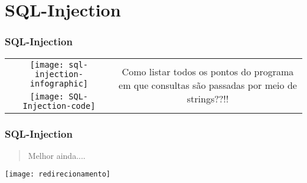 \documentclass[10pt, aspectratio=169]{beamer}
\begin{document}
\section{SQL-Injection}
\begin{frame}
	\frametitle{SQL-Injection}
	
	\begin{quotation}
	\end{quotation}
	\begin{center}
		\begin{tabular}{c c}
			\texttt{[image: sql-injection-infographic]} & \multirow{2}{4cm}{Como listar todos os pontos do programa em que consultas são passadas por meio de strings??!!}
			\\
			\texttt{[image: SQL-Injection-code]}
		\end{tabular}
		
	\end{center}
	
	
	
	
	\vfill
	\vfill
	
\end{frame}

\begin{frame}
	\frametitle{SQL-Injection}
	
	\begin{quotation}
		\Large{Melhor ainda....}
	\end{quotation}
	\begin{center}
		
		\texttt{[image: redirecionamento]}
	\end{center}
	
	
	
	
	\vfill
	\vfill
	
\end{frame}
\end{document}
